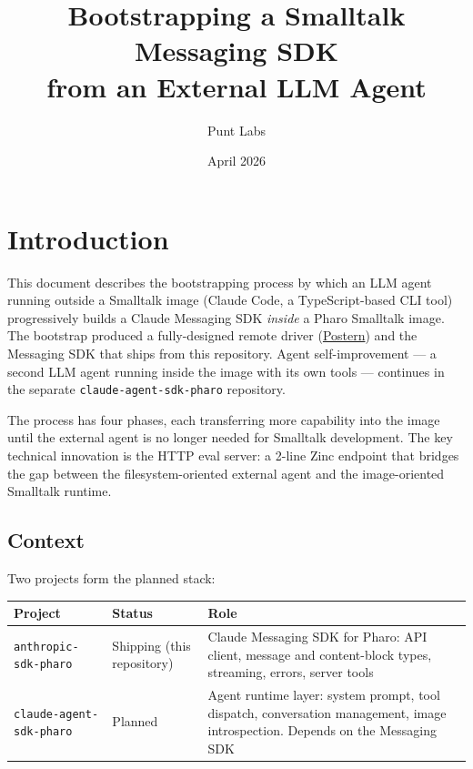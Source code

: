 \documentclass[a4paper,10pt,fleqn]{article}
\begin{document}
\title{Bootstrapping a Smalltalk Messaging SDK\\from an External LLM Agent}
\author{Punt Labs}
\date{April 2026}
\maketitle

\tableofcontents
\newpage

\section{Introduction}

This document describes the bootstrapping process by which an LLM agent
running outside a Smalltalk image (Claude Code, a TypeScript-based CLI
tool) progressively builds a Claude Messaging SDK \emph{inside} a Pharo
Smalltalk image.  The bootstrap produced a fully-designed remote driver
(\href{https://github.com/punt-labs/postern}{Postern}) and the
Messaging SDK that ships from this repository.  Agent self-improvement
--- a second LLM agent running inside the image with its own tools ---
continues in the separate \texttt{claude-agent-sdk-pharo} repository.

The process has four phases, each transferring more capability into the
image until the external agent is no longer needed for Smalltalk
development.  The key technical innovation is the HTTP eval server: a
2-line Zinc endpoint that bridges the gap between the filesystem-oriented
external agent and the image-oriented Smalltalk runtime.

\subsection{Context}

Two projects form the planned stack:

\begin{center}
\begin{tabularx}{\linewidth}{@{}llY@{}}
\toprule
\textbf{Project} & \textbf{Status} & \textbf{Role} \\
\midrule
\texttt{anthropic-sdk-pharo} & Shipping (this repository) &
  Claude Messaging SDK for Pharo: API client, message and content-block
  types, streaming, errors, server tools \\
\texttt{claude-agent-sdk-pharo} & Planned &
  Agent runtime layer: system prompt, tool dispatch, conversation
  management, image introspection.  Depends on the Messaging SDK \\
\bottomrule
\end{tabularx}
\end{center}
\end{document}
